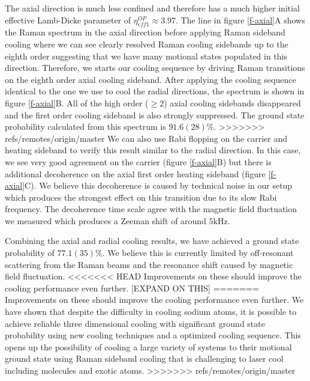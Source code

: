 \documentclass[aps,prl,twocolumn,groupedaddress]{revtex4-1}
\begin{document}
The axial direction is much less confined and therefore has a much higher initial effective
Lamb-Dicke parameter of $\eta^{OP}_{eff1}\approx3.97$.
The line in figure \ref{f-axial}A shows the Raman spectrum in the axial direction
before applying Raman sideband cooling where we can see clearly resolved Raman cooling sidebands
up to the eighth order suggesting that we have many motional states populated in this direction.
Therefore, we starts our cooling sequence by driving Raman transitions on the eighth order axial
cooling sideband. After applying the cooling sequence identical to the one we use to cool
the radial directions, the spectrum is shown in figure \ref{f-axial}B.
All of the high order ($\geqslant2$) axial cooling sidebands disappeared and the first order
cooling sideband is also strongly suppressed.
The ground state probability calculated from this spectrum is $91.6(28)\%$.
>>>>>>> refs/remotes/origin/master
We can also use Rabi flopping on the carrier and heating sideband to verify this result
similar to the radial direction. In this case, we see very good agreement on the carrier
(figure \ref{f-axial}B) but there is additional decoherence on the axial first order
heating sideband (figure \ref{f-axial}C).
We believe this decoherence is caused by technical noise in our setup which
produces the strongest effect on this transition due to its slow Rabi frequency.
The decoherence time scale agree with the magnetic field fluctuation we measured which produces
a Zeeman shift of around $5\text{kHz}$.

Combining the axial and radial cooling results,
we have achieved a ground state probability of $77.1(35)\%$.
We believe this is currently limited by off-resonant scattering from the Raman beams
and the resonance shift caused by magnetic field fluctuation.
<<<<<<< HEAD
Improvements on these should improve the cooling performance even further.  [EXPAND ON THIS]
=======
Improvements on these should improve the cooling performance even further.
We have shown that despite the difficulty in cooling sodium atoms,
it is possible to achieve reliable three dimensional cooling with significant ground state
probability using new cooling techniques and a optimized cooling sequence.
This opens up the possibility of cooling a large variety of systems to their motional ground
state using Raman sideband cooling that is challenging to laser cool
including molecules and exotic atoms.
>>>>>>> refs/remotes/origin/master



\end{document}
